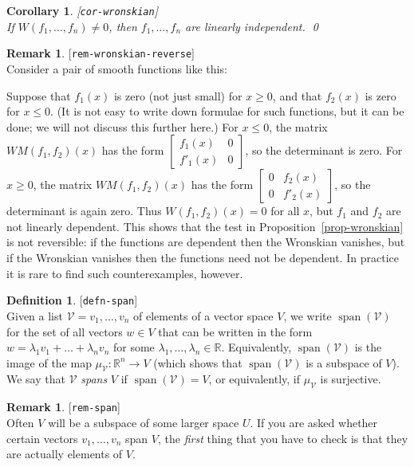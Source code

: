\documentclass{amsart}
\newcommand{\lbl}[1]{\label{#1}\textup{[\texttt{#1}]}\ \\}
\newcommand{\lbl}{\label}
\newcommand{\R}         {{\mathbb{R}}}
\newcommand{\spn}       {\operatorname{span}}
\newcommand{\bbm}       {\left[\begin{matrix}}
\newcommand{\ebm}       {\end{matrix}\right]}
\newcommand{\lm}        {\lambda}
\newcommand{\xra}       {\xrightarrow}
\newcommand{\CV}        {{\mathcal{V}}}
\renewcommand{\:}       {\colon}
\newtheorem{corollary}[theorem]{Corollary}
\theoremstyle{definition}
\newtheorem{remark}[theorem]{Remark}
\newtheorem{definition}[theorem]{Definition}
\begin{document}
\begin{corollary}\lbl{cor-wronskian}
 If $W(f_1,\dotsc,f_n)\neq 0$, then $f_1,\dotsc,f_n$ are
 linearly independent. \qed
\end{corollary}

\begin{remark}\lbl{rem-wronskian-reverse}
 Consider a pair of smooth functions like this:
 \begin{center}
 \end{center}
 Suppose that $f_1(x)$ is zero (not just small) for
 $x\geq 0$, and that $f_2(x)$ is zero for $x\leq 0$.  (It is
 not easy to write down formulae for such functions, but it
 can be done; we will not discuss this further here.)  For
 $x\leq 0$, the matrix $WM(f_1,f_2)(x)$ has the form
 $\bbm f_1(x)&0\\ f'_1(x)&0\ebm$, so the determinant is
 zero.  For $x\geq 0$, the matrix $WM(f_1,f_2)(x)$ has the
 form $\bbm 0&f_2(x)\\ 0&f'_2(x)\ebm$, so the determinant is
 again zero.  Thus $W(f_1,f_2)(x)=0$ for all $x$, but $f_1$
 and $f_2$ are not linearly dependent.  This shows that the
 test in Proposition~\ref{prop-wronskian} is not reversible:
 if the functions are dependent then the Wronskian vanishes,
 but if the Wronskian vanishes then the functions need not
 be dependent.  In practice it is rare to find such
 counterexamples, however.
\end{remark}

\begin{definition}\lbl{defn-span}
 Given a list $\CV=v_1,\ldots,v_n$ of elements of a vector
 space $V$, we write $\spn(\CV)$ for the set of all vectors
 $w\in V$ that can be written in the form
 $w=\lm_1v_1+\ldots+\lm_nv_n$ for some
 $\lm_1,\ldots,\lm_n\in\R$.  Equivalently, $\spn(\CV)$ is
 the image of the map $\mu_{\CV}\:\R^n\xra{}V$ (which shows
 that $\spn(\CV)$ is a subspace of $V$).  We say that $\CV$
 \emph{spans} $V$ if $\spn(\CV)=V$, or equivalently, if
 $\mu_{\CV}$ is surjective.
\end{definition}
\begin{remark}\lbl{rem-span}
 Often $V$ will be a subspace of some larger space $U$.  If
 you are asked whether certain vectors $v_1,\dotsc,v_n$ span
 $V$, the \emph{first} thing that you have to check is that
 they are actually elements of $V$.  
\end{remark}
\end{document}

